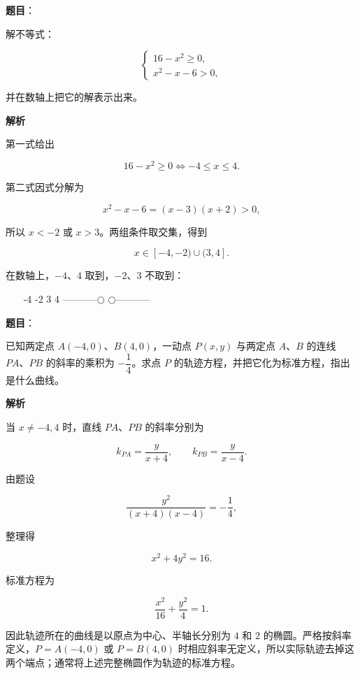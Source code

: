 \begin{answer}

\textbf{题目}：

解不等式：

\nopagebreak[4]
\[
\begin{cases}
16-x^2\geqslant0,\\
x^2-x-6>0,
\end{cases}
\]

并在数轴上把它的解表示出来。

\textbf{解析}

第一式给出

\nopagebreak[4]
\[
16-x^2\geqslant0\Longleftrightarrow -4\leqslant x\leqslant4.
\]

第二式因式分解为

\nopagebreak[4]
\[
x^2-x-6=(x-3)(x+2)>0,
\]

所以 $x<-2$ 或 $x>3$。两组条件取交集，得到

\nopagebreak[4]
\[
x\in[-4,-2)\cup(3,4].
\]

在数轴上，$-4$、$4$ 取到，$-2$、$3$ 不取到：

~~~
-4          -2                 3          4
 \textbullet{}-----------$\bigcirc$                 $\bigcirc$-----------\textbullet{}
~~~


\end{answer}
\begin{answer}

\textbf{题目}：

已知两定点 $A(-4,0)$、$B(4,0)$，一动点 $P(x,y)$ 与两定点 $A\text{、}B$ 的连线 $PA\text{、}PB$ 的斜率的乘积为 $-\dfrac14$。求点 $P$ 的轨迹方程，并把它化为标准方程，指出是什么曲线。

\textbf{解析}

当 $x\ne-4,4$ 时，直线 $PA$、$PB$ 的斜率分别为

\nopagebreak[4]
\[
k_{PA}=\frac{y}{x+4},
\qquad
k_{PB}=\frac{y}{x-4}.
\]

由题设

\nopagebreak[4]
\[
\frac{y^2}{(x+4)(x-4)}=-\frac14,
\]

整理得

\nopagebreak[4]
\[
x^2+4y^2=16.
\]

标准方程为

\nopagebreak[4]
\[
\frac{x^2}{16}+\frac{y^2}{4}=1.
\]

因此轨迹所在的曲线是以原点为中心、半轴长分别为 $4$ 和 $2$ 的椭圆。严格按斜率定义，$P=A(-4,0)$ 或 $P=B(4,0)$ 时相应斜率无定义，所以实际轨迹去掉这两个端点；通常将上述完整椭圆作为轨迹的标准方程。


\end{answer}
